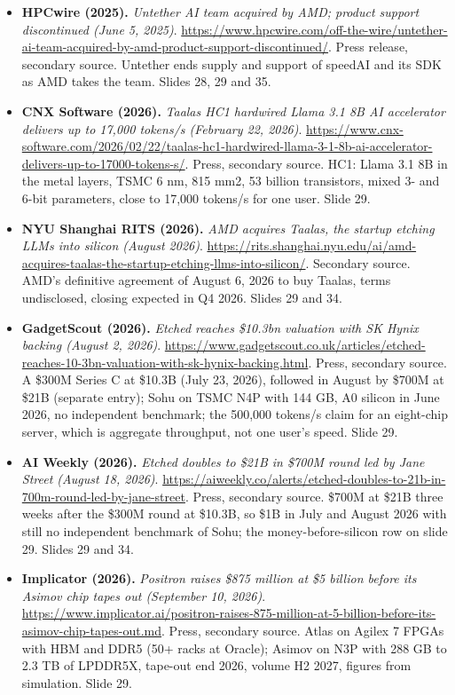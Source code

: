 \begin{itemize}[leftmargin=1.2em,itemsep=3pt]
\item \textbf{HPCwire (2025).} \textit{Untether AI team acquired by AMD; product support discontinued (June 5, 2025)}. \url{https://www.hpcwire.com/off-the-wire/untether-ai-team-acquired-by-amd-product-support-discontinued/}. Press release, secondary source. Untether ends supply and support of speedAI and its SDK as AMD takes the team. Slides 28, 29 and 35.
\item \textbf{CNX Software (2026).} \textit{Taalas HC1 hardwired Llama 3.1 8B AI accelerator delivers up to 17,000 tokens/s (February 22, 2026)}. \url{https://www.cnx-software.com/2026/02/22/taalas-hc1-hardwired-llama-3-1-8b-ai-accelerator-delivers-up-to-17000-tokens-s/}. Press, secondary source. HC1: Llama 3.1 8B in the metal layers, TSMC 6 nm, 815 mm2, 53 billion transistors, mixed 3- and 6-bit parameters, close to 17,000 tokens/s for one user. Slide 29.
\item \textbf{NYU Shanghai RITS (2026).} \textit{AMD acquires Taalas, the startup etching LLMs into silicon (August 2026)}. \url{https://rits.shanghai.nyu.edu/ai/amd-acquires-taalas-the-startup-etching-llms-into-silicon/}. Secondary source. AMD's definitive agreement of August 6, 2026 to buy Taalas, terms undisclosed, closing expected in Q4 2026. Slides 29 and 34.
\item \textbf{GadgetScout (2026).} \textit{Etched reaches \$10.3bn valuation with SK Hynix backing (August 2, 2026)}. \url{https://www.gadgetscout.co.uk/articles/etched-reaches-10-3bn-valuation-with-sk-hynix-backing.html}. Press, secondary source. A \$300M Series C at \$10.3B (July 23, 2026), followed in August by \$700M at \$21B (separate entry); Sohu on TSMC N4P with 144 GB, A0 silicon in June 2026, no independent benchmark; the 500,000 tokens/s claim for an eight-chip server, which is aggregate throughput, not one user's speed. Slide 29.
\item \textbf{AI Weekly (2026).} \textit{Etched doubles to \$21B in \$700M round led by Jane Street (August 18, 2026)}. \url{https://aiweekly.co/alerts/etched-doubles-to-21b-in-700m-round-led-by-jane-street}. Press, secondary source. \$700M at \$21B three weeks after the \$300M round at \$10.3B, so \$1B in July and August 2026 with still no independent benchmark of Sohu; the money-before-silicon row on slide 29. Slides 29 and 34.
\item \textbf{Implicator (2026).} \textit{Positron raises \$875 million at \$5 billion before its Asimov chip tapes out (September 10, 2026)}. \url{https://www.implicator.ai/positron-raises-875-million-at-5-billion-before-its-asimov-chip-tapes-out.md}. Press, secondary source. Atlas on Agilex 7 FPGAs with HBM and DDR5 (50+ racks at Oracle); Asimov on N3P with 288 GB to 2.3 TB of LPDDR5X, tape-out end 2026, volume H2 2027, figures from simulation. Slide 29.

\end{itemize}
